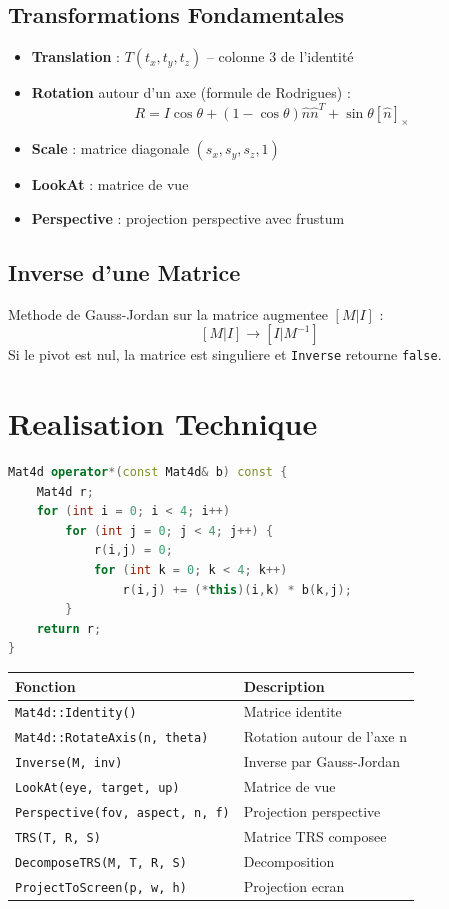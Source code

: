 \documentclass[12pt,a4paper]{article}
\begin{document}
\subsection{Transformations Fondamentales}

\begin{itemize}
    \item \textbf{Translation} : $T(t_x, t_y, t_z)$ -- colonne 3 de l'identit\'e
    \item \textbf{Rotation} autour d'un axe (formule de Rodrigues) :
    \[
        R = I\cos\theta + (1-\cos\theta)\hat{n}\hat{n}^T + \sin\theta[\hat{n}]_\times
    \]
    \item \textbf{Scale} : matrice diagonale $(s_x, s_y, s_z, 1)$
    \item \textbf{LookAt} : matrice de vue
    \item \textbf{Perspective} : projection perspective avec frustum
\end{itemize}

\subsection{Inverse d'une Matrice}

Methode de Gauss-Jordan sur la matrice augmentee $[M | I]$ :
\[
    [M | I] \longrightarrow [I | M^{-1}]
\]
Si le pivot est nul, la matrice est singuliere et \texttt{Inverse} retourne \texttt{false}.

\section{Realisation Technique}

\begin{lstlisting}[language=C++, caption=Produit matriciel Mat4d]
Mat4d operator*(const Mat4d& b) const {
    Mat4d r;
    for (int i = 0; i < 4; i++)
        for (int j = 0; j < 4; j++) {
            r(i,j) = 0;
            for (int k = 0; k < 4; k++)
                r(i,j) += (*this)(i,k) * b(k,j);
        }
    return r;
}
\end{lstlisting}

\begin{center}
\begin{tabular}{ll}
    \toprule
    \textbf{Fonction} & \textbf{Description} \\
    \midrule
    \texttt{Mat4d::Identity()} & Matrice identite \\
    \texttt{Mat4d::RotateAxis(n, theta)} & Rotation autour de l'axe n \\
    \texttt{Inverse(M, inv)} & Inverse par Gauss-Jordan \\
    \texttt{LookAt(eye, target, up)} & Matrice de vue \\
    \texttt{Perspective(fov, aspect, n, f)} & Projection perspective \\
    \texttt{TRS(T, R, S)} & Matrice TRS composee \\
    \texttt{DecomposeTRS(M, T, R, S)} & Decomposition \\
    \texttt{ProjectToScreen(p, w, h)} & Projection ecran \\
    \bottomrule
\end{tabular}
\end{center}
\end{document}
